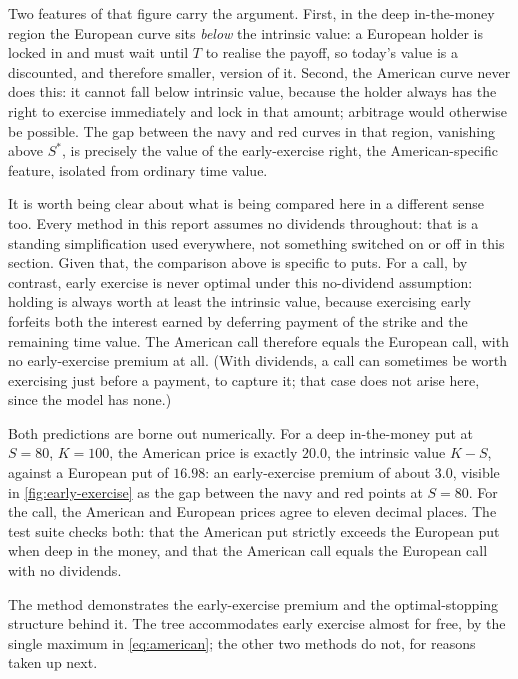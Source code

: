 \documentclass[11pt,a4paper]{article}
\numberwithin{equation}{section}
\theoremstyle{definition}
\theoremstyle{plain}
\theoremstyle{remark}
\begin{document}
Two features of that figure carry the argument. First, in the deep
in-the-money region the European curve sits \emph{below} the intrinsic
value: a European holder is locked in and must wait until $T$ to realise the
payoff, so today's value is a discounted, and therefore smaller, version of
it. Second, the American curve never does this: it cannot fall below
intrinsic value, because the holder always has the right to exercise
immediately and lock in that amount; arbitrage would otherwise be possible.
The gap between the navy and red curves in that region, vanishing above
$S^{\ast}$, is precisely the value of the early-exercise right, the
American-specific feature, isolated from ordinary time value.

It is worth being clear about what is being compared here in a different
sense too. Every method in
this report assumes no dividends throughout: that is a standing
simplification used everywhere, not something switched on or off in this
section. Given that, the comparison above is specific to puts. For a
call, by contrast, early exercise is never
optimal under this no-dividend assumption: holding is always worth at least the intrinsic value, because
exercising early forfeits both the interest earned by deferring payment of the
strike and the remaining time value. The American call therefore equals the
European call, with no early-exercise premium at all. (With dividends, a call
can sometimes be worth exercising just
before a payment, to capture it; that case does not arise here, since the
model has none.)

Both predictions are borne out numerically. For a deep in-the-money put at $S = 80$,
$K = 100$, the American price is exactly $20.0$, the intrinsic value $K - S$,
against a European put of $16.98$: an early-exercise premium of about $3.0$,
visible in \cref{fig:early-exercise} as the gap between the navy and red points
at $S=80$. For the call, the
American and European prices agree to eleven decimal places. The test suite checks
both: that the American put strictly exceeds the European put when deep in the
money, and that the American call equals the European call with no dividends.

The method demonstrates the early-exercise premium and the optimal-stopping
structure behind it. The tree accommodates early exercise almost for free, by the
single maximum in \eqref{eq:american}; the other two methods do not, for reasons
taken up next.

\clearpage
\end{document}
